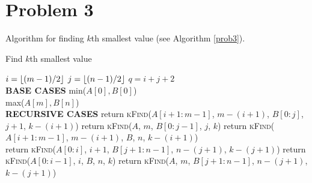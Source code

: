 \documentclass{article}
\DeclarePairedDelimiter\floor{\lfloor}{\rfloor}
\begin{document}
\section*{Problem 3}
Algorithm for finding $k$th smallest value (see Algorithm \ref{prob3}).
		\begin{algorithm}
		\caption{Find $k$th smallest value}\label{prob3}
		\begin{algorithmic}[1]
		\State $i = \floor{(m-1)/2}$
		\State $j = \floor{(n-1)/2}$
		\State $q = i + j + 2$
		\\
		\State \textbf{BASE CASES}
		\State \Return min($A[0],B[0]$)
		\EndIf
		\\
		\State \Return max($A[m],B[n]$)
		\EndIf
		\\
		
		\State \textbf{RECURSIVE CASES}
				\State return \textsc{kFind}($A[i+1:m-1]$, $m-(i+1)$, $B[0:j]$, $j+1$, $k-(i+1)$)
				\State return \textsc{kFind}($A$, $m$, $B[0:j-1]$, $j$, $k$)
				\State return \textsc{kFind}($A[i+1:m-1]$, $m-(i+1)$, $B$, $n$, $k-(i+1)$)
			\EndIf
		\EndIf
		\\
				\State return \textsc{kFind}($A[0:i]$, $i+1$, $B[j+1:n-1]$, $n-(j+1)$, $k-(j+1)$)
				\State return \textsc{kFind}($A[0:i-1]$, $i$, $B$, $n$, $k$)
				\State return \textsc{kFind}($A$, $m$, $B[j+1:n-1]$, $n-(j+1)$, $k-(j+1)$)
			\EndIf
		\EndIf
		\EndFunction
		
		\end{algorithmic}
		\end{algorithm}
\end{document}
